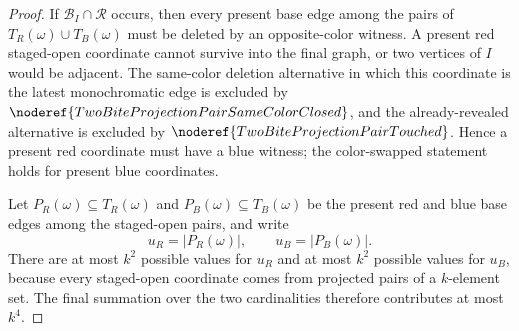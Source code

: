\begin{proof}
If \(\mathcal B_I\cap\mathcal R\) occurs, then every present base edge among
the pairs of \(T_R(\omega)\cup T_B(\omega)\) must be deleted by an
opposite-color witness.  A present red staged-open coordinate cannot survive
into the final graph, or two vertices of \(I\) would be adjacent.  The
same-color deletion alternative in which this coordinate is the latest
monochromatic edge is excluded by
\(\noderef{TwoBiteProjectionPairSameColorClosed}\), and the already-revealed
alternative is excluded by
\(\noderef{TwoBiteProjectionPairTouched}\).  Hence a present red coordinate
must have a blue witness; the color-swapped statement holds for present blue
coordinates.

Let \(P_R(\omega)\subseteq T_R(\omega)\) and
\(P_B(\omega)\subseteq T_B(\omega)\) be the present red and blue base edges
among the staged-open pairs, and write
\[
u_R=|P_R(\omega)|,\qquad u_B=|P_B(\omega)|.
\]
There are at most \(k^2\) possible values for \(u_R\) and at most \(k^2\)
possible values for \(u_B\), because every staged-open coordinate comes from
projected pairs of a \(k\)-element set.  The final summation over the two
cardinalities therefore contributes at most \(k^4\).


\end{proof}
